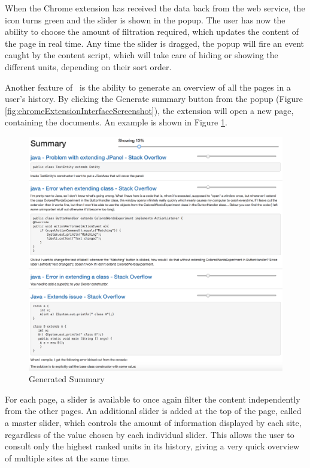 When the Chrome extension has received the data back from the web service, the icon turns green and the slider is shown in the popup. The user has now the ability to choose the amount of filtration required, which updates the content of the page in real time. Any time the slider is dragged, the popup will fire an event caught by the content script, which will take care of hiding or showing the different units, depending on their sort order.


Another feature of \projectName~is the ability to generate an overview of all the pages in a user's history. By clicking the Generate summary button from the popup (Figure \ref{fig:chromeExtensionInterfaceScreenshot}), the extension will open a new page, containing the documents. An example is shown in Figure \ref{fig:chromeExtensionSummaryScreenshot}.
\begin{figure}[H]
\centering
\includegraphics[scale=0.3]{Figures/SummaryExample}
\caption{Generated Summary}
\label{fig:chromeExtensionSummaryScreenshot}
\end{figure}

For each page, a slider is available to once again filter the content independently from the other pages. An additional slider is added at the top of the page, called a master slider, which controls the amount of information displayed by each site, regardless of the value chosen by each individual slider. This allows the user to consult only the highest ranked units in its history, giving a very quick overview of multiple sites at the same time.
